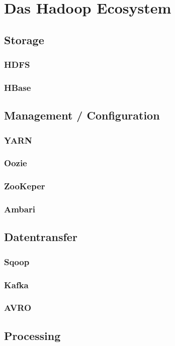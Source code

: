 \chapter{Das Hadoop Ecosystem}
\section{Storage}
\subsection{HDFS}
\subsection{HBase}

\section{Management / Configuration}
\subsection{YARN}
\subsection{Oozie}
\subsection{ZooKeper}
\subsection{Ambari}

\section{Datentransfer}
\subsection{Sqoop}
\subsection{Kafka}
\subsection{AVRO}

\section{Processing}
